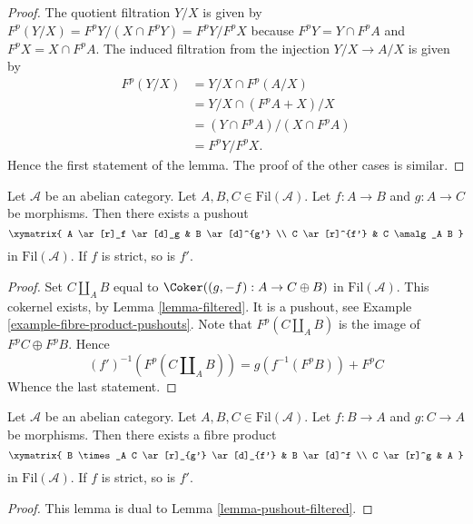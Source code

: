 \begin{proof}
The quotient filtration $Y/X$ is given by
$F^p(Y/X) = F^pY/(X \cap F^pY) = F^pY/F^pX$
because $F^pY = Y \cap F^pA$ and $F^pX = X \cap F^pA$.
The induced filtration from the injection $Y/X \to A/X$ is given by
\begin{align*}
F^p(Y/X) & = Y/X \cap F^p(A/X) \\
& = Y/X \cap (F^pA + X)/X \\
& = (Y \cap F^pA)/(X \cap F^pA) \\
& = F^pY/F^pX.
\end{align*}
Hence the first statement of the lemma.
The proof of the other cases is similar.
\end{proof}

\begin{lemma}
\label{lemma-pushout-filtered}
Let $\mathcal{A}$ be an abelian category.
Let $A, B, C \in \text{Fil}(\mathcal{A})$.
Let $f : A \to B$ and $g : A \to C$ be morphisms.
Then there exists a pushout
$$
\xymatrix{
A \ar[r]_f \ar[d]_g & B \ar[d]^{g'} \\
C \ar[r]^{f'} & C \amalg_A B
}
$$
in $\text{Fil}(\mathcal{A})$. If $f$ is strict, so is $f'$.
\end{lemma}

\begin{proof}
Set $C \amalg_A B$ equal to $\Coker((g, -f) : A \to C \oplus B)$
in $\text{Fil}(\mathcal{A})$. This cokernel exists, by
Lemma \ref{lemma-filtered}.
It is a pushout, see
Example \ref{example-fibre-product-pushouts}.
Note that $F^p(C \amalg_A B)$ is the image of $F^pC \oplus F^pB$.
Hence
$$
(f')^{-1}(F^p(C \amalg_A B)) = g(f^{-1}(F^pB)) + F^pC
$$
Whence the last statement.
\end{proof}

\begin{lemma}
\label{lemma-fibre-product-filtered}
Let $\mathcal{A}$ be an abelian category.
Let $A, B, C \in \text{Fil}(\mathcal{A})$.
Let $f : B \to A$ and $g : C \to A$ be morphisms.
Then there exists a fibre product
$$
\xymatrix{
B \times_A C \ar[r]_{g'} \ar[d]_{f'} & B \ar[d]^f \\
C \ar[r]^g & A
}
$$
in $\text{Fil}(\mathcal{A})$. If $f$ is strict, so is $f'$.
\end{lemma}

\begin{proof}
This lemma is dual to
Lemma \ref{lemma-pushout-filtered}.
\end{proof}


